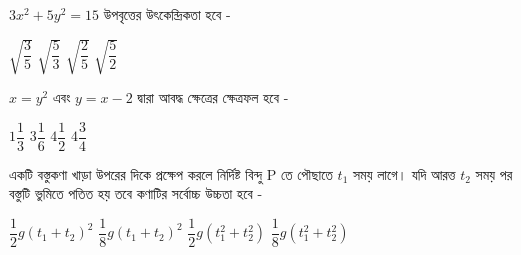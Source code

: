 \documentclass[addpoints]{exam}
\begin{document}
\begin{questions}
\begin{oneparchoices}
\end{oneparchoices}

\question $ 3x^{2}+5y^{2} =15 $ উপবৃত্তের উৎকেন্দ্রিকতা হবে -

\begin{oneparchoices}
\choice $ \sqrt{\dfrac{3}{5}} $
\choice $ \sqrt{\dfrac{5}{3}} $
\choice $ \sqrt{\dfrac{2}{5}} $
\choice $ \sqrt{\dfrac{5}{2}} $

\end{oneparchoices}

\question  $ x=y^{2} $  এবং $ y=x-2 $ দ্বারা আবদ্ধ ক্ষেত্রের ক্ষেত্রফল হবে -

\begin{oneparchoices}
\choice $ 1\dfrac{1}{3} $
\choice $ 3\dfrac{1}{6} $
\choice $ 4\dfrac{1}{2} $
\choice $ 4\dfrac{3}{4} $
\end{oneparchoices}

\question  একটি বস্তুকণা খাড়া উপরের দিকে প্রক্ষেপ করলে নির্দিষ্ট বিন্দু P তে পৌছাতে $ t_{1} $ সময় লাগে। যদি আরত্ত $ t_{2} $  সময় পর বস্তুটি ভুমিতে পতিত হয় তবে কণাটির সর্বোচ্চ উচ্চতা হবে - 

\begin{oneparchoices}
\choice $ \dfrac{1}{2}g(t_{1}+t_{2})^{2} $
\choice $ \dfrac{1}{8}g(t_{1}+t_{2})^{2} $
\choice $ \dfrac{1}{2}g(t_{1}^{2}+t_{2}^{2}) $
\choice $ \dfrac{1}{8}g(t_{1}^{2}+t_{2}^{2}) $
\end{oneparchoices}

\end{questions}
\end{document}
